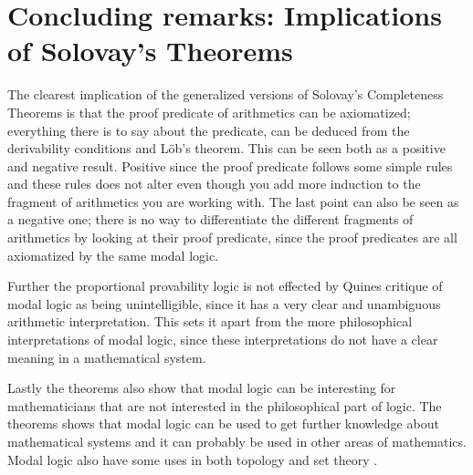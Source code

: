 \documentclass[../main.tex]{subfiles}
\begin{document}
\section{Concluding remarks: Implications of Solovay's Theorems}

The clearest implication of the generalized versions of Solovay's Completeness
Theorems is that the proof predicate of arithmetics can be axiomatized;
everything there is to say about the predicate, can be deduced from the
derivability conditions and Löb's theorem. This can be seen both as a positive
and negative result. Positive since the proof predicate follows some simple
rules and these rules  does not alter even though you add more induction to the
fragment of arithmetics you are working with. The last point can also be seen
as a negative one; there is no way to differentiate the different fragments of
arithmetics by looking at their proof predicate, since the proof predicates are
all axiomatized by the same modal logic.

Further the proportional provability logic is not effected by Quines critique of
modal logic as being unintelligible, since it has a very clear and unambiguous
arithmetic interpretation. This sets it apart from the more philosophical
interpretations of modal logic, since these interpretations do not have a clear
meaning in a mathematical system.

Lastly the theorems also show that modal logic can be interesting for
mathematicians that are not interested in the philosophical part of logic. The
theorems shows that modal logic can be used to get further knowledge about
mathematical systems and it can probably be used in other areas of mathematics.
Modal logic also have some uses in both topology and set theory
\parencite{Artemov2007}.
\end{document}
